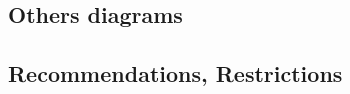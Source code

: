 \subsection{Others diagrams}


\begin{comment}
Why ? When ? How ?

First ideas :

 	\begin{itemize}
  		\item requirement
  		\item ... ?
	\end{itemize}  	

\end{comment}



\subsection{Recommendations, Restrictions}



\begin{comment}
Which elements are recommended or not.

\end{comment}

